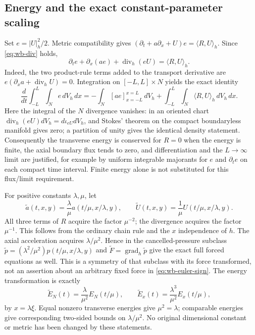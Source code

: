 \subsection{Energy and the exact constant-parameter scaling}
Set $e=|U|_h^2/2$. Metric compatibility gives
$(\partial_t+a\partial_x+U)e=\langle R,U\rangle_h$.
Since \eqref{eq:wb-div} holds,
\begin{equation}\label{eq:wb-local-energy}
 \partial_te+\partial_x(ae)+\operatorname{div}_h(eU)
 =\langle R,U\rangle_h.
\end{equation}
Indeed, the two product-rule terms added to the transport derivative
are $e(\partial_xa+\operatorname{div}_hU)=0$. Integration on
$[-L,L]\times N$ yields the exact identity
\[
 \frac{d}{dt}\int_{-L}^L\!\int_N e\,dV_h\,dx
 =-\int_N[ae]_{x=-L}^{x=L}\,dV_h
 +\int_{-L}^L\!\int_N\langle R,U\rangle_h\,dV_h\,dx.
\]
Here the integral of the $N$ divergence vanishes: in an oriented
chart $\operatorname{div}_h(eU)dV_h=d\iota_{eU}dV_h$, and Stokes'
theorem on the compact boundaryless manifold gives zero; a partition
of unity gives the identical density statement. Consequently the
transverse energy is conserved for $R=0$ when the energy is finite,
the axial boundary flux tends to zero, and differentiation and the
$L\to\infty$ limit are justified, for example by uniform integrable
majorants for $e$ and $\partial_te$ on each compact time interval.
Finite energy alone is not substituted for this flux/limit requirement.

For positive constants $\lambda,\mu$, let
\[
 \widetilde a(t,x,y)=\frac\lambda\mu
 a(t/\mu,x/\lambda,y),\qquad
 \widetilde U(t,x,y)=\frac1\mu U(t/\mu,x/\lambda,y).
\]
All three terms of $R$ acquire the factor $\mu^{-2}$; the divergence
acquires the factor $\mu^{-1}$. This follows from the ordinary chain
rule and the $x$ independence of $h$. The axial acceleration acquires
$\lambda/\mu^2$. Hence in the cancelled-pressure subclass
$\widetilde p=(\lambda^2/\mu^2)p(t/\mu,x/\lambda,y)$ and
$\widetilde F=\operatorname{grad}_h\widetilde p$ give the exact
full forced equations as well. This is a symmetry of that subclass
with its force transformed, not an assertion about an arbitrary fixed
force in \eqref{eq:wb-euler-sign}. The energy transformation is exactly
\begin{equation}\label{eq:wb-energy-scale}
 \widetilde E_N(t)=\frac\lambda{\mu^2}E_N(t/\mu),\qquad
 \widetilde E_x(t)=\frac{\lambda^3}{\mu^2}E_x(t/\mu),
\end{equation}
by $x=\lambda\xi$. Equal nonzero transverse energies give
$\mu^2=\lambda$; comparable energies give corresponding two-sided
bounds on $\lambda/\mu^2$. No original dimensional constant or metric
has been changed by these statements.


